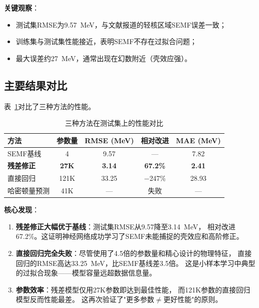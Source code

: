 \documentclass[12pt, a4paper]{article}
\begin{document}
\textbf{关键观察}：
\begin{itemize}
  \item 测试集RMSE为9.57~MeV，与文献报道的轻核区域SEMF误差一致；
  \item 训练集与测试集性能接近，表明SEMF不存在过拟合问题；
  \item 最大误差约27~MeV，通常出现在幻数附近（壳效应强）。
\end{itemize}

\subsection{主要结果对比}

表~\ref{tab:main_results}对比了三种方法的性能。

\begin{table}[htbp]
  \centering
  \caption{三种方法在测试集上的性能对比}
  \label{tab:main_results}
  \begin{tabular}{lcccc}
    \toprule
    \textbf{方法} & \textbf{参数量} & \textbf{RMSE (MeV)} & \textbf{相对改进} & \textbf{MAE (MeV)} \\
    \midrule
    SEMF基线 & 4 & 9.57 & --- & 7.82 \\
    \textbf{残差修正} & \textbf{27K} & \textbf{3.14} & \textbf{67.2\%} & \textbf{2.41} \\
    直接回归 & 121K & 33.25 & $-$247\% & 28.93 \\
    哈密顿量预测 & 41K & --- & 失败 & --- \\
    \bottomrule
  \end{tabular}
\end{table}

\textbf{核心发现}：

\begin{enumerate}
  \item \textbf{残差修正大幅优于基线}：测试集RMSE从9.57降至3.14~MeV，
        相对改进67.2\%。这证明神经网络成功学习了SEMF未能捕捉的壳效应和高阶修正。

  \item \textbf{直接回归完全失败}：尽管使用了4.5倍的参数量和精心设计的物理特征，
        直接回归的RMSE高达33.25~MeV，比SEMF基线差3.5倍。
        这是小样本学习中典型的过拟合现象——模型容量远超数据信息量。

  \item \textbf{参数效率}：残差模型仅用27K参数即达到最佳性能，
        而121K参数的直接回归模型反而性能最差。
        这再次验证了"更多参数$\neq$更好性能"的原则。
\end{enumerate}
\end{document}
